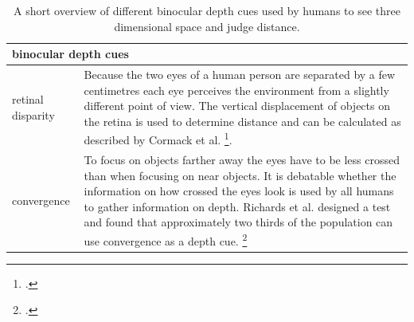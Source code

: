 \begin{table}[h!]
	\begin{tabularx}{\textwidth}{|l|X|}
		\hline
		\multicolumn{2}{|l|}{\textbf{binocular depth cues}} \\
		\hline
		retinal disparity & Because the two eyes of a human person are separated by a few centimetres each eye perceives the environment from a slightly different point of view. The vertical displacement of objects on the retina is used to determine distance and can be calculated as described by Cormack et al. \footcite{Cormack_The_computation_of_retinal_disparity}.\\
		\hline
		convergence & To focus on objects farther away the eyes have to be less crossed than when focusing on near objects. It is debatable whether the information on how crossed the eyes look is used by all humans to gather information on depth. Richards et al. designed a test and found that approximately two thirds of the population can use convergence as a depth cue. \footcite{Richards_Convergence_as_a_cue_to_depth} \\
		\hline
	\end{tabularx}
	\label{tab:study_of_literature_binocular_depth_cues}
	\caption{A short overview of different binocular depth cues used by humans to see three dimensional space and judge distance.}
\end{table}

\newpage

